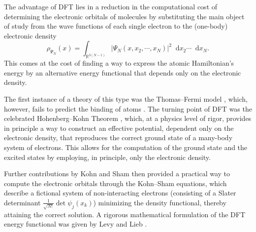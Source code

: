\documentclass[12pt,a4paper]{amsart}
\numberwithin{equation}{section}
\newcommand*\diff{\mathop{}\!\mathrm{d}}
\begin{document}
	The advantage of DFT lies in a reduction in the computational cost of determining the electronic orbitals of molecules by substituting the main object of study from the wave functions of each single electron to the (one-body) electronic density 
	\begin{equation}\label{eq:def_density}
		\rho_{\Psi_N}(x)=\int_{\mathbb{R}^{3(N-1)}}|\Psi_N(x,x_2,\cdots,x_N)|^2\diff x_2\cdots\diff x_N.
	\end{equation}
	This comes at the cost of finding a way to express the atomic Hamiltonian’s energy by an alternative energy functional that depends only on the electronic density.
	
	The first instance of a theory of this type was the Thomas–Fermi model \cite{enrico1927metodo,Thomas_1927}, which, however, fails to predict the binding of atoms \cite{Teller1962}. The turning point of DFT was the celebrated Hohenberg–Kohn Theorem \cite{HohenbergKohn}, which, at a physics level of rigor, provides in principle a way to construct an effective potential, dependent only on the electronic density, that reproduces the correct ground state of a many-body system of electrons. This allows for the computation of the ground state and the excited states by employing, in principle, only the electronic density.
	
	Further contributions by Kohn and Sham then provided a practical way to compute the electronic orbitals through the Kohn–Sham equations, which describe a fictional system of non-interacting electrons (consisting of a Slater determinant $ \frac{1}{\sqrt{N!}} \det \psi_j(x_k) $) minimizing the density functional, thereby attaining the correct solution. A rigorous mathematical formulation of the DFT energy functional was given by Levy and Lieb \cite{Levy1979,lieb1983density}.
	
\end{document}
